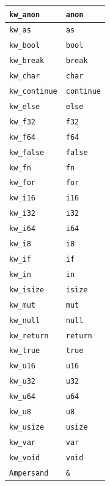 \begin{xltabular}{\textwidth}{l|X}
	\texttt{kw\_anon} & \texttt{anon} \\ \hline
	\texttt{kw\_as} & \texttt{as} \\ \hline
	\texttt{kw\_bool} & \texttt{bool} \\ \hline
	\texttt{kw\_break} & \texttt{break} \\ \hline
	\texttt{kw\_char} & \texttt{char} \\ \hline
	\texttt{kw\_continue} & \texttt{continue} \\ \hline
	\texttt{kw\_else} & \texttt{else} \\ \hline
	\texttt{kw\_f32} & \texttt{f32} \\ \hline
	\texttt{kw\_f64} & \texttt{f64} \\ \hline
	\texttt{kw\_false} & \texttt{false} \\ \hline
	\texttt{kw\_fn} & \texttt{fn} \\ \hline
	\texttt{kw\_for} & \texttt{for} \\ \hline
	\texttt{kw\_i16} & \texttt{i16} \\ \hline
	\texttt{kw\_i32} & \texttt{i32} \\ \hline
	\texttt{kw\_i64} & \texttt{i64} \\ \hline
	\texttt{kw\_i8} & \texttt{i8} \\ \hline
	\texttt{kw\_if} & \texttt{if} \\ \hline
	\texttt{kw\_in} & \texttt{in} \\ \hline
	\texttt{kw\_isize} & \texttt{isize} \\ \hline
	\texttt{kw\_mut} & \texttt{mut} \\ \hline
	\texttt{kw\_null} & \texttt{null} \\ \hline
	\texttt{kw\_return} & \texttt{return} \\ \hline
	\texttt{kw\_true} & \texttt{true} \\ \hline
	\texttt{kw\_u16} & \texttt{u16} \\ \hline
	\texttt{kw\_u32} & \texttt{u32} \\ \hline
	\texttt{kw\_u64} & \texttt{u64} \\ \hline
	\texttt{kw\_u8} & \texttt{u8} \\ \hline
	\texttt{kw\_usize} & \texttt{usize} \\ \hline
	\texttt{kw\_var} & \texttt{var} \\ \hline
	\texttt{kw\_void} & \texttt{void} \\ \hline
	\texttt{Ampersand} & \texttt{\&} \\ \hline

\end{xltabular}
